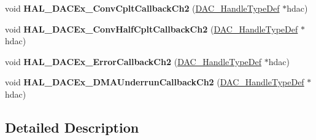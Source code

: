 \begin{DoxyCompactItemize}
\item 
\mbox{\label{group___d_a_c_ex___exported___functions___group1_gadf84b0c08bfe452d7861563fd4ee424d}} 
void {\bfseries H\+A\+L\+\_\+\+D\+A\+C\+Ex\+\_\+\+Conv\+Cplt\+Callback\+Ch2} (\mbox{\hyperlink{struct_d_a_c___handle_type_def}{D\+A\+C\+\_\+\+Handle\+Type\+Def}} $\ast$hdac)
\item 
\mbox{\label{group___d_a_c_ex___exported___functions___group1_gae8d236b1014fad4b2246f1ff553f8fd4}} 
void {\bfseries H\+A\+L\+\_\+\+D\+A\+C\+Ex\+\_\+\+Conv\+Half\+Cplt\+Callback\+Ch2} (\mbox{\hyperlink{struct_d_a_c___handle_type_def}{D\+A\+C\+\_\+\+Handle\+Type\+Def}} $\ast$hdac)
\item 
\mbox{\label{group___d_a_c_ex___exported___functions___group1_ga7cb20eb27136a27b9b5bdf1c263e69cf}} 
void {\bfseries H\+A\+L\+\_\+\+D\+A\+C\+Ex\+\_\+\+Error\+Callback\+Ch2} (\mbox{\hyperlink{struct_d_a_c___handle_type_def}{D\+A\+C\+\_\+\+Handle\+Type\+Def}} $\ast$hdac)
\item 
\mbox{\label{group___d_a_c_ex___exported___functions___group1_ga27693be11fb6b5d5232b0e36ea4aad45}} 
void {\bfseries H\+A\+L\+\_\+\+D\+A\+C\+Ex\+\_\+\+D\+M\+A\+Underrun\+Callback\+Ch2} (\mbox{\hyperlink{struct_d_a_c___handle_type_def}{D\+A\+C\+\_\+\+Handle\+Type\+Def}} $\ast$hdac)
\end{DoxyCompactItemize}


\subsection{Detailed Description}
